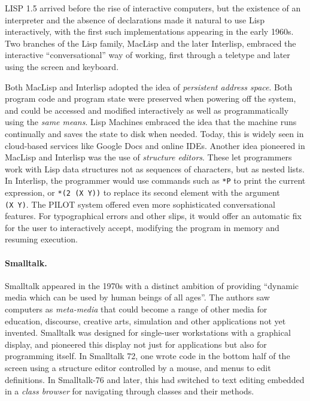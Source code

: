 \documentclass[english,submission]{programming}
\providecommand{\DIFadd}[1]{{\protect\color{blue}\uwave{#1}}} %
\providecommand{\DIFaddbegin}{} %
\providecommand{\DIFaddend}{} %
\begin{document}
LISP 1.5\DIFaddbegin \DIFadd{~}\DIFaddend \cite{LISP15} arrived before the rise of interactive computers,
but the existence of an interpreter and the absence of declarations made
it natural to use Lisp interactively, with the first such
implementations appearing in the early 1960s. Two branches of the Lisp
family\DIFaddbegin \DIFadd{~}\DIFaddend \cite{LispEvolve}, MacLisp and the later Interlisp, embraced the
interactive ``conversational'' way of working, first through a teletype
and later using the screen and keyboard.

Both MacLisp and Interlisp adopted the idea of \emph{persistent address
space}. Both program code and program state were preserved when powering
off the system, and could be accessed and modified interactively as well
as programmatically using the \emph{same means}. Lisp Machines embraced
the idea that the machine runs continually and saves the state to disk
when needed. Today, this is widely seen in cloud-based services like
Google Docs and online IDEs. Another idea pioneered in MacLisp and
Interlisp was the use of \emph{structure editors}. These let programmers
work with Lisp data structures not as sequences of characters, but as
nested lists. In Interlisp, the programmer would use commands such as
\texttt{*P} to print the current expression, or \texttt{*(2\ (X\ Y))} to
replace its second element with the argument \texttt{(X\ Y)}. The PILOT
system\DIFaddbegin \DIFadd{~}\DIFaddend \cite{Pilot} offered even more sophisticated conversational
features. For typographical errors and other slips, it would offer an
automatic fix for the user to interactively accept, modifying the
program in memory and resuming execution.

\paragraph{Smalltalk.}

Smalltalk appeared in the 1970s with a distinct ambition of providing
``dynamic media which can be used by human beings of all
ages''\DIFaddbegin \DIFadd{~}\DIFaddend \cite{PersonalDynMedia}. The authors saw computers as
\emph{meta-media} that could become a range of other media for
education, discourse, creative arts, simulation and other applications
not yet invented. Smalltalk was designed for single-user workstations
with a graphical display, and pioneered this display not just for
applications but also for programming itself. In Smalltalk 72, one wrote
code in the bottom half of the screen using a structure editor
controlled by a mouse, and menus to edit definitions. In Smalltalk-76
and later, this had switched to text editing embedded in a \emph{class
browser} for navigating through classes and their methods.
\end{document}
